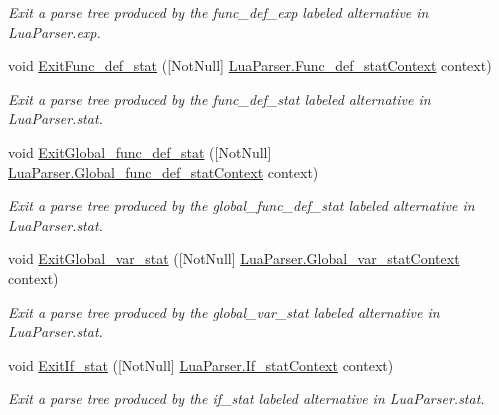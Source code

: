 \begin{DoxyCompactItemize}
\begin{DoxyCompactList}\small\item\em Exit a parse tree produced by the {\ttfamily func\+\_\+def\+\_\+exp} labeled alternative in Lua\+Parser.\+exp. \end{DoxyCompactList}\item 
void \mbox{\hyperlink{classzlua_1_1_compiler_a3c652ebce04bd5127161319606311859}{Exit\+Func\+\_\+def\+\_\+stat}} (\mbox{[}Not\+Null\mbox{]} \mbox{\hyperlink{classzlua_1_1_lua_parser_1_1_func__def__stat_context}{Lua\+Parser.\+Func\+\_\+def\+\_\+stat\+Context}} context)
\begin{DoxyCompactList}\small\item\em Exit a parse tree produced by the {\ttfamily func\+\_\+def\+\_\+stat} labeled alternative in Lua\+Parser.\+stat. \end{DoxyCompactList}\item 
void \mbox{\hyperlink{classzlua_1_1_compiler_a2d4b742668c3002d6396dca636a97dce}{Exit\+Global\+\_\+func\+\_\+def\+\_\+stat}} (\mbox{[}Not\+Null\mbox{]} \mbox{\hyperlink{classzlua_1_1_lua_parser_1_1_global__func__def__stat_context}{Lua\+Parser.\+Global\+\_\+func\+\_\+def\+\_\+stat\+Context}} context)
\begin{DoxyCompactList}\small\item\em Exit a parse tree produced by the {\ttfamily global\+\_\+func\+\_\+def\+\_\+stat} labeled alternative in Lua\+Parser.\+stat. \end{DoxyCompactList}\item 
void \mbox{\hyperlink{classzlua_1_1_compiler_a6c1f448ee93660853921f2c0048bc173}{Exit\+Global\+\_\+var\+\_\+stat}} (\mbox{[}Not\+Null\mbox{]} \mbox{\hyperlink{classzlua_1_1_lua_parser_1_1_global__var__stat_context}{Lua\+Parser.\+Global\+\_\+var\+\_\+stat\+Context}} context)
\begin{DoxyCompactList}\small\item\em Exit a parse tree produced by the {\ttfamily global\+\_\+var\+\_\+stat} labeled alternative in Lua\+Parser.\+stat. \end{DoxyCompactList}\item 
void \mbox{\hyperlink{classzlua_1_1_compiler_afca7da08ee84a7b0797de722420b443a}{Exit\+If\+\_\+stat}} (\mbox{[}Not\+Null\mbox{]} \mbox{\hyperlink{classzlua_1_1_lua_parser_1_1_if__stat_context}{Lua\+Parser.\+If\+\_\+stat\+Context}} context)
\begin{DoxyCompactList}\small\item\em Exit a parse tree produced by the {\ttfamily if\+\_\+stat} labeled alternative in Lua\+Parser.\+stat. \end{DoxyCompactList}\item 

\end{DoxyCompactItemize}
